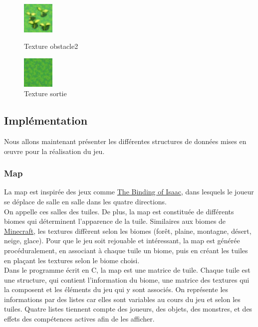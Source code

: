 \documentclass[11pt]{article}
\begin{document}
            \begin{figure}[H]
                \centering
                \begin{minipage}{0.45\textwidth}
                    \centering
                    \includegraphics[height=1.5cm]{obstacle2.png}
                    \caption{Texture obstacle2}
                    \label{fig:obstacle2}
                \end{minipage}
                \hfill
                \begin{minipage}{0.45\textwidth}
                    \centering
                    \includegraphics[height=1.5cm]{sortie.png}
                    \caption{Texture sortie}
                    \label{fig:sortie}
                \end{minipage}
            \end{figure}

        \subsection{Implémentation}
        Nous allons maintenant présenter les différentes structures de données mises en œuvre pour la réalisation du jeu.
            \subsubsection{Map}
            La map est inspirée des jeux comme \href{https://en.wikipedia.org/wiki/The_Binding_of_Isaac_(video_game)}{The Binding of Isaac}, 
            dans lesquels le joueur se déplace de salle en salle dans les quatre directions. \\
            On appelle ces salles des tuiles. De plus, la map est constituée de différents biomes qui déterminent l'apparence de la tuile. Similaires aux biomes de \href{https://fr.wikipedia.org/wiki/Minecraft}{Minecraft},
            les textures diffèrent selon les biomes (forêt, plaine, montagne, désert, neige, glace).
            Pour que le jeu soit rejouable et intéressant, la map est générée procéduralement, en associant à chaque tuile un biome, 
            puis en créant les tuiles en plaçant les textures selon le biome choisi.\\
            Dans le programme écrit en C, la map est une matrice de tuile. Chaque tuile est une structure, qui contient l'information du biome, 
            une matrice des textures qui la composent et les éléments du jeu qui y sont associés.
            On représente les informations par des listes car elles sont variables au cours du jeu et selon les tuiles. 
            Quatre listes tiennent compte des joueurs, des objets, des monstres, et des effets des compétences actives afin de les afficher.
\end{document}
